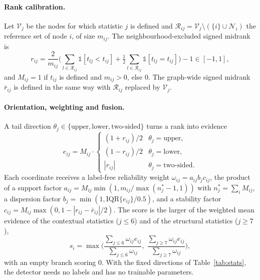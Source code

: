 \documentclass[pdflatex,sn-mathphys-ay]{sn-jnl}
\theoremstyle{plain}
\theoremstyle{remark}
\begin{document}
\paragraph{Rank calibration.} Let $\mathcal{V}_j$ be the nodes for which statistic $j$ is defined and $\mathcal{R}_{ij}=\mathcal{V}_j\setminus(\{i\}\cup\mathcal{N}_i)$ the reference set of node $i$, of size $m_{ij}$. The neighbourhood-excluded signed midrank is
\begin{equation}\label{eq:rank}
r_{ij}=\frac{2}{m_{ij}}\Big(\sum_{l\in\mathcal{R}_{ij}}\mathbb{1}[t_{lj}<t_{ij}]+\tfrac12\sum_{l\in\mathcal{R}_{ij}}\mathbb{1}[t_{lj}=t_{ij}]\Big)-1\in[-1,1],
\end{equation}
and $M_{ij}=1$ if $t_{ij}$ is defined and $m_{ij}>0$, else $0$. The graph-wide signed midrank $\bar r_{ij}$ is defined in the same way with $\mathcal{R}_{ij}$ replaced by $\mathcal{V}_j$.

\paragraph{Orientation, weighting and fusion.} A tail direction $\theta_j\in\{\text{upper},\text{lower},\text{two-sided}\}$ turns a rank into evidence
\begin{equation}\label{eq:orient}
e_{ij}=M_{ij}\cdot\begin{cases}(1+r_{ij})/2 & \theta_j=\text{upper},\\ (1-r_{ij})/2 & \theta_j=\text{lower},\\ |r_{ij}| & \theta_j=\text{two-sided}.\end{cases}
\end{equation}
Each coordinate receives a label-free reliability weight $\omega_{ij}=a_{ij}b_jc_{ij}$, the product of a support factor $a_{ij}=M_{ij}\min(1,m_{ij}/\max(n_j^{*}-1,1))$ with $n_j^*=\sum_iM_{ij}$, a dispersion factor $b_j=\min(1,\mathrm{IQR}\{e_{ij}\}/0.5)$, and a stability factor $c_{ij}=M_{ij}\max(0,1-|r_{ij}-\bar r_{ij}|/2)$. The score is the larger of the weighted mean evidence of the contextual statistics ($j\le6$) and of the structural statistics ($j\ge7$),
\begin{equation}\label{eq:fusion}
s_i=\max\Big(\frac{\sum_{j\le6}\omega_{ij}e_{ij}}{\sum_{j\le6}\omega_{ij}},\;\frac{\sum_{j\ge7}\omega_{ij}e_{ij}}{\sum_{j\ge7}\omega_{ij}}\Big),
\end{equation}
with an empty branch scoring 0. With the fixed directions of Table~\ref{tab:stats}, the detector needs no labels and has no trainable parameters.
\end{document}
